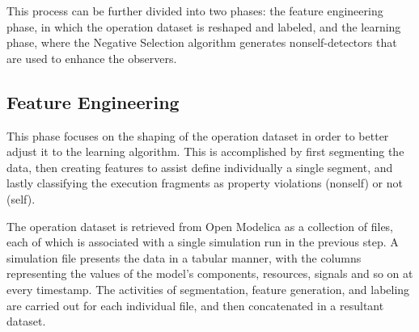 This process can be further divided into two phases: the feature engineering phase, in which the operation dataset is reshaped and labeled, and the learning phase, where the Negative Selection algorithm generates nonself-detectors that are used to enhance the observers.



\subsection{Feature Engineering}

This phase focuses on the shaping of the operation dataset in order to better adjust it to the learning algorithm. This is accomplished by first segmenting the data, then creating features to assist define individually a single segment, and lastly classifying the execution fragments as property violations (nonself) or not (self). 

The operation dataset is retrieved from Open Modelica as a collection of files, each of which is associated with a single simulation run in the previous step. A simulation file presents the data in a tabular manner, with the columns representing the values of the model's components, resources, signals and so on at every timestamp. The activities of segmentation, feature generation, and labeling are carried out for each individual file, and then concatenated in a resultant dataset.

